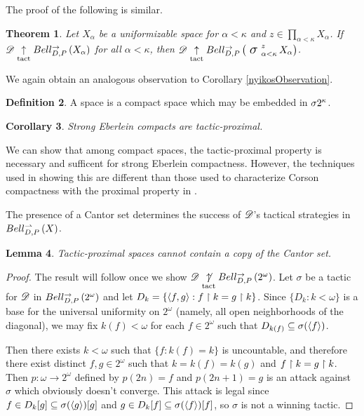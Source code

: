 \documentclass{amsart}
\newtheorem{theorem}{Theorem}[section]
\newtheorem{lemma}[theorem]{Lemma}
\newtheorem{corollary}[theorem]{Corollary}
\theoremstyle{definition}
\newtheorem{definition}[theorem]{Definition}
\begin{document}
  The proof of the following is similar.

  \begin{theorem}
    Let \(X_\alpha\) be a uniformizable space for \(\alpha<\kappa\)
    and \(z\in \prod_{\alpha<\kappa}X_\alpha\).
    If
    \(\mathscr{D}\underset{\text{tact}}{\uparrow}Bell_{D,P}^{\to}\left({X_\alpha}\right)\) for all \(\alpha<\kappa\),
    then
    \(\pl D\tactwin\bellAbsConGame{\sigmaProd_{\alpha<\kappa}^z X_\alpha}\).
  \end{theorem}

  We again obtain an analogous observation to Corollary
  \ref{nyikosObservation}.

  \begin{definition}
    A  space is a compact space which
    may be embedded in \(\sigma2^{\kappa}\).
  \end{definition}

  \begin{corollary}
    Strong Eberlein compacts are tactic-proximal.
  \end{corollary}

  We can show that among compact spaces, the tactic-proximal property is
  necessary and sufficent for strong Eberlein compactness.
  However, the techniques used in showing this are different than those
  used to characterize Corson compactness with the proximal property in
  \cite{MR3227201}.

  The presence of a Cantor set determines the success of \(\mathscr{D}\)'s
  tactical strategies in \(Bell_{D,P}^{\rightharpoonup}\left({X}\right)\).

  \begin{lemma}
    Tactic-proximal spaces cannot contain a copy of the Cantor set.
  \end{lemma}

  \begin{proof}
    The result will follow once we show
    \(\mathscr{D}\underset{\text{tact}}{\not\uparrow}Bell_{D,P}^{\to}\left({2^\omega}\right)\).
    Let \(\sigma\) be a tactic for \(\mathscr{D}\) in \(Bell_{D,P}^{\to}\left({2^\omega}\right)\)
    and let \(D_k=\{\langle f,g\rangle:f\restriction k = g\restriction k\}\). Since \(\{D_k:k<\omega\}\)
    is a base for the universal uniformity on \(2^\omega\)
    (namely, all open neighborhoods of the diagonal),
    we may fix \(k(f)<\omega\)
    for each \(f\in2^\omega\) such that \(D_{k(f)}\subseteq\sigma(\langle f\rangle)\).

    Then there exists \(k<\omega\) such that \(\{f:k(f)=k\}\) is uncountable,
    and therefore there exist distinct \(f,g\in2^\omega\)
    such that \(k=k(f)=k(g)\) and
    \(f\restriction k=g\restriction k\). Then \(p:\omega\to2^\omega\) defined by
    \(p(2n)=f\) and \(p(2n+1)=g\) is an attack against \(\sigma\) which
    obviously doesn't converge. This attack is legal since
    \(f\in D_k[g]\subseteq\sigma(\langle g\rangle)[g]\) and
    \(g\in D_k[f]\subseteq\sigma(\langle f\rangle)[f]\), so \(\sigma\) is not a winning
    tactic.
  \end{proof}
\end{document}
